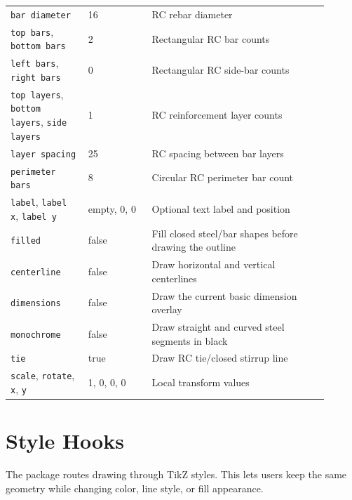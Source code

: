 \documentclass[10pt]{article}
\newcommand{\keyname}[1]{\texttt{#1}}
\begin{document}
\begin{longtable}{p{0.22\linewidth}p{0.18\linewidth}p{0.50\linewidth}}
\keyname{bar diameter} & 16 & RC rebar diameter \\
\keyname{top bars}, \keyname{bottom bars} & 2 & Rectangular RC bar counts \\
\keyname{left bars}, \keyname{right bars} & 0 & Rectangular RC side-bar counts \\
\keyname{top layers}, \keyname{bottom layers}, \keyname{side layers} & 1 & RC reinforcement layer counts \\
\keyname{layer spacing} & 25 & RC spacing between bar layers \\
\keyname{perimeter bars} & 8 & Circular RC perimeter bar count \\
\keyname{label}, \keyname{label x}, \keyname{label y} & empty, 0, 0 & Optional text label and position \\
\keyname{filled} & false & Fill closed steel/bar shapes before drawing the outline \\
\keyname{centerline} & false & Draw horizontal and vertical centerlines \\
\keyname{dimensions} & false & Draw the current basic dimension overlay \\
\keyname{monochrome} & false & Draw straight and curved steel segments in black \\
\keyname{tie} & true & Draw RC tie/closed stirrup line \\
\keyname{scale}, \keyname{rotate}, \keyname{x}, \keyname{y} & 1, 0, 0, 0 & Local transform values \\
\bottomrule
\end{longtable}

\section{Style Hooks}

The package routes drawing through TikZ styles. This lets users keep the same
geometry while changing color, line style, or fill appearance.
\end{document}
